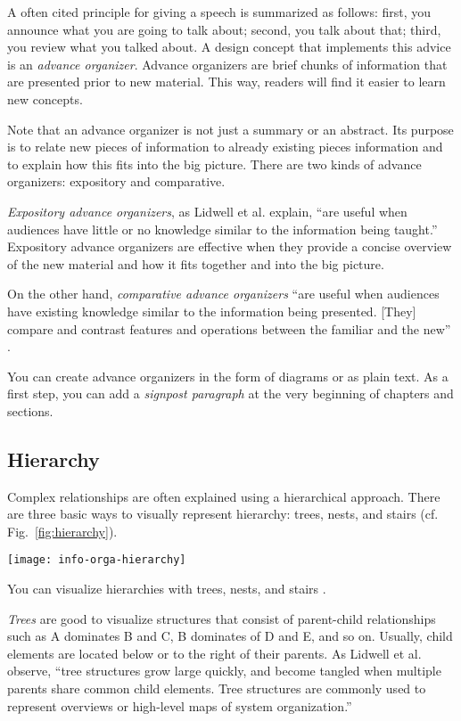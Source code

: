 A often cited principle for giving a speech is summarized as follows: first, you announce what you are going to talk about; second, you talk about that; third, you review what you talked about. A design concept that implements this advice is an \emph{advance organizer}. Advance organizers are brief chunks of information that are presented prior to new material. This way, readers will find it easier to learn new concepts.

Note that an advance organizer is not just a summary or an abstract. Its purpose is to relate new pieces of information to already existing pieces information and to explain how this fits into the big picture. There are two kinds of advance organizers: expository and comparative.

\emph{Expository advance organizers}, as Lidwell et al. \cite{Lidwell10} explain, ``are useful when audiences have little or no knowledge similar to the information being taught.'' Expository advance organizers are effective when they provide a concise overview of the new material and how it fits together and into the big picture.

On the other hand, \emph{comparative advance organizers} ``are useful when audiences have existing knowledge similar to the information being presented. [They] compare and contrast features and operations between the familiar and the new'' \cite{Lidwell10}.

You can create advance organizers in the form of diagrams or as plain text. As a first step, you can add a \emph{signpost paragraph} at the very beginning of chapters and sections.

\subsection{Hierarchy}

Complex relationships are often explained using a hierarchical approach. 
There are three basic ways to visually represent hierarchy: trees, nests, and stairs (cf. Fig.~\ref{fig:hierarchy}).


\begin{marginfigure}
\centering
\texttt{[image: info-orga-hierarchy]}
\caption{\label{fig:hierarchy} You can visualize hierarchies with trees, nests, and stairs \cite{Lidwell10}.} 
\end{marginfigure}


\emph{Trees} are good to visualize structures that consist of parent-child relationships such as A dominates B and C, B dominates of D and E, and so on. 
Usually, child elements are located below or to the right of their parents. As Lidwell et al. \cite{Lidwell10} observe, ``tree structures grow large quickly, and become tangled when multiple parents share common child elements. Tree structures are commonly used to represent overviews or high-level maps of system organization.''

